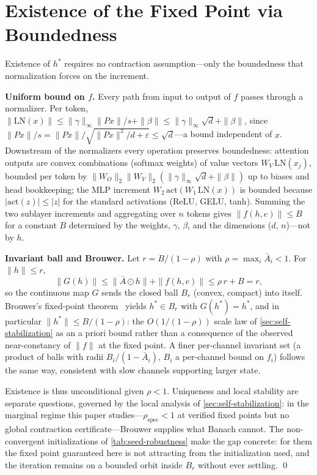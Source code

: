 \documentclass[11pt]{article}
\begin{document}
\section{Existence of the Fixed Point via Boundedness}
\label{app:existence}

Existence of $h^*$ requires no contraction assumption---only the boundedness that normalization forces on the increment.

\textbf{Uniform bound on $f$.} Every path from input to output of $f$ passes through a normalizer. Per token, $\|\text{LN}(x)\| \le \|\gamma\|_\infty \|Px\|/s + \|\beta\| \le \|\gamma\|_\infty \sqrt{d} + \|\beta\|$, since $\|Px\|/s = \|Px\|/\sqrt{\|Px\|^2/d + \varepsilon} \le \sqrt{d}$---a bound independent of $x$. Downstream of the normalizers every operation preserves boundedness: attention outputs are convex combinations (softmax weights) of value vectors $W_V\,\text{LN}(x_j)$, bounded per token by $\|W_O\|_2\|W_V\|_2(\|\gamma\|_\infty\sqrt{d} + \|\beta\|)$ up to biases and head bookkeeping; the MLP increment $W_2\,\text{act}(W_1\,\text{LN}(x))$ is bounded because $|\text{act}(z)| \le |z|$ for the standard activations (ReLU, GELU, tanh). Summing the two sublayer increments and aggregating over $n$ tokens gives $\|f(h, e)\| \le B$ for a constant $B$ determined by the weights, $\gamma$, $\beta$, and the dimensions ($d$, $n$)---not by $h$.

\textbf{Invariant ball and Brouwer.} Let $r = B/(1 - \rho)$ with $\rho = \max_i \bar{A}_i < 1$. For $\|h\| \le r$,
\begin{equation}
\|G(h)\| \le \|\bar{A} \odot h\| + \|f(h,e)\| \le \rho\, r + B = r,
\end{equation}
so the continuous map $G$ sends the closed ball $B_r$ (convex, compact) into itself. Brouwer's fixed-point theorem~\citep{granas2003} yields $h^* \in B_r$ with $G(h^*) = h^*$, and in particular $\|h^*\| \le B/(1-\rho)$: the $O(1/(1-\rho))$ scale law of \cref{sec:self-stabilization} as an a priori bound rather than a consequence of the observed near-constancy of $\|f\|$ at the fixed point. A finer per-channel invariant set (a product of balls with radii $B_i/(1-\bar{A}_i)$, $B_i$ a per-channel bound on $f_i$) follows the same way, consistent with slow channels supporting larger state.

Existence is thus unconditional given $\rho < 1$. Uniqueness and local stability are separate questions, governed by the local analysis of \cref{sec:self-stabilization}: in the marginal regime this paper studies---$\rho_{\text{spec}} < 1$ at verified fixed points but no global contraction certificate---Brouwer supplies what Banach cannot. The non-convergent initializations of \cref{tab:seed-robustness} make the gap concrete: for them the fixed point guaranteed here is not attracting from the initialization used, and the iteration remains on a bounded orbit inside $B_r$ without ever settling. \qed
\end{document}

